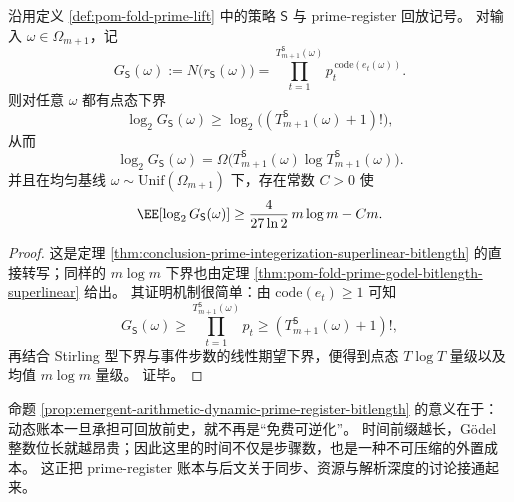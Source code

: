 \begin{proposition}\label{prop:emergent-arithmetic-dynamic-prime-register-bitlength}
沿用定义 \ref{def:pom-fold-prime-lift} 中的策略 \(\mathsf S\) 与 prime-register 回放记号。
对输入 \(\omega\in\Omega_{m+1}\)，记
\[
G_{\mathsf S}(\omega):=N\!\bigl(r_{\mathsf S}(\omega)\bigr)
=\prod_{t=1}^{T_{m+1}^{\mathsf S}(\omega)}
p_t^{\,\mathrm{code}(e_t(\omega))}.
\]
则对任意 \(\omega\) 都有点态下界
\[
\log_2 G_{\mathsf S}(\omega)
\ge
\log_2\!\bigl((T_{m+1}^{\mathsf S}(\omega)+1)!\bigr),
\]
从而
\[
\log_2 G_{\mathsf S}(\omega)
=
\Omega\!\bigl(T_{m+1}^{\mathsf S}(\omega)\log T_{m+1}^{\mathsf S}(\omega)\bigr).
\]
并且在均匀基线 \(\omega\sim\mathrm{Unif}(\Omega_{m+1})\) 下，存在常数 \(C>0\) 使
\[
\EE[\log_2 G_{\mathsf S}(\omega)]
\ge
\frac{4}{27\ln 2}\,m\log m-Cm.
\]
\end{proposition}

\begin{proof}
这是定理 \ref{thm:conclusion-prime-integerization-superlinear-bitlength} 的直接转写；同样的 \(m\log m\) 下界也由定理 \ref{thm:pom-fold-prime-godel-bitlength-superlinear} 给出。
其证明机制很简单：由 \(\mathrm{code}(e_t)\ge 1\) 可知
\[
G_{\mathsf S}(\omega)\ge \prod_{t=1}^{T_{m+1}^{\mathsf S}(\omega)}p_t\ge (T_{m+1}^{\mathsf S}(\omega)+1)!,
\]
再结合 Stirling 型下界与事件步数的线性期望下界，便得到点态 \(T\log T\) 量级以及均值 \(m\log m\) 量级。
证毕。
\end{proof}

\begin{remark}[位长增长就是时间外置成本]\label{rem:emergent-arithmetic-dynamic-prime-register-bitlength-cost}
命题 \ref{prop:emergent-arithmetic-dynamic-prime-register-bitlength} 的意义在于：动态账本一旦承担可回放前史，就不再是“免费可逆化”。
时间前缀越长，Gödel 整数位长就越昂贵；因此这里的时间不仅是步骤数，也是一种不可压缩的外置成本。
这正把 prime-register 账本与后文关于同步、资源与解析深度的讨论接通起来。
\end{remark}

